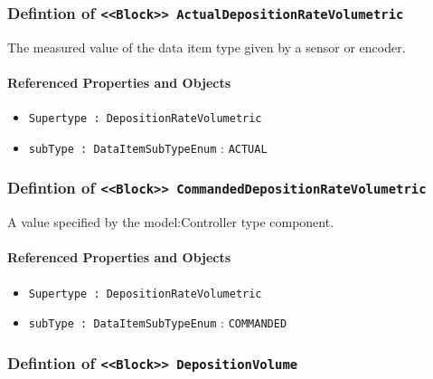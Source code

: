 \subsubsection{Defintion of \texttt{<<Block>> ActualDepositionRateVolumetric}}
  \label{type:ActualDepositionRateVolumetric}

\FloatBarrier

The measured value of the data item type given by a sensor or encoder.

\FloatBarrier
\paragraph{Referenced Properties and Objects}

\begin{itemize}
\item \texttt{Supertype : DepositionRateVolumetric}

\item \texttt{subType : DataItemSubTypeEnum} : \texttt{ACTUAL}

\end{itemize}
\FloatBarrier
\subsubsection{Defintion of \texttt{<<Block>> CommandedDepositionRateVolumetric}}
  \label{type:CommandedDepositionRateVolumetric}

\FloatBarrier

A value specified by the {model:Controller} type component.

\FloatBarrier
\paragraph{Referenced Properties and Objects}

\begin{itemize}
\item \texttt{Supertype : DepositionRateVolumetric}

\item \texttt{subType : DataItemSubTypeEnum} : \texttt{COMMANDED}

\end{itemize}
\FloatBarrier
\subsubsection{Defintion of \texttt{<<Block>> DepositionVolume}}
  \label{type:DepositionVolume}

